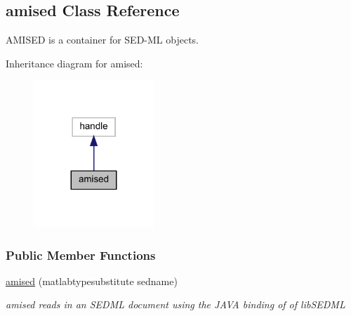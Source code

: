 \hypertarget{classamised}{}\subsection{amised Class Reference}
\label{classamised}


A\+M\+I\+S\+ED is a container for S\+E\+D-\/\+ML objects.  




Inheritance diagram for amised\+:
\nopagebreak
\begin{figure}[H]
\begin{center}
\leavevmode
\includegraphics[width=128pt]{classamised__inherit__graph}
\end{center}
\end{figure}
\subsubsection*{Public Member Functions}
\begin{DoxyCompactItemize}
\item 
\mbox{\hyperlink{classamised_ad3f005f06f3a83fccf6ae55ad0d102c0}{amised}} (matlabtypesubstitute sedname)
\begin{DoxyCompactList}\small\item\em amised reads in an S\+E\+D\+ML document using the J\+A\+VA binding of of lib\+S\+E\+D\+ML \end{DoxyCompactList}\end{DoxyCompactItemize}
